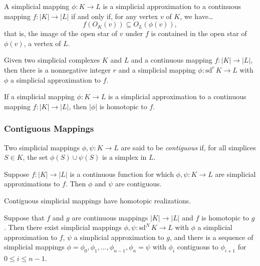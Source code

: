 \begin{proposition}
A simplicial mapping $\phi : K \rightarrow L$ is a simplicial approximation to a continuous mapping
$f: |K| \rightarrow |L|$ if and only if, for any vertex $v$ of $K$, we have\dots
$$f(O_K(v)) \subseteq O_L(\phi(v)),$$
that is, the image of the open star of $v$ under $f$ is contained in the open star of $\phi(v)$, a vertex of $L$.
\end{proposition}

\begin{theorem}
Given two simplicial complexes $K$ and $L$ and a continuous mapping $f : |K| \rightarrow |L|$,
then there is a nonnegative integer $r$ and a simplicial mapping $\phi: \textrm{sd}^r\, K \rightarrow L$
with $\phi$ a simplicial approximation to $f$.
\end{theorem}

\begin{proposition}
If a simplicial mapping $\phi : K \rightarrow L$ is a simplicial approximation to a continuous
mapping $f: |K| \rightarrow |L|$, then $|\phi|$ is homotopic to $f$.
\end{proposition}

\subsubsection{Contiguous Mappings}\label{contiguous}
Two simplicial mappings $\phi, \psi: K \rightarrow L$ are said to be \emph{contiguous} if, for all simplices $S \in K$,
the set $\phi(S) \cup \psi(S)$ is a simplex in $L$.

\begin{lemma}
Suppose $f : |K| \rightarrow |L|$ is a continuous function for which $\phi, \psi: K \rightarrow L$
are simplicial approximations to $f$. Then $\phi$ and $\psi$ are contiguous.
\end{lemma}

\begin{proposition}
Contiguous simplicial mappings have homotopic realizations.
\end{proposition}

\begin{theorem}
Suppose that $f$ and $g$ are continuous mappings $|K| \rightarrow |L|$ and $f$ is homotopic to $g$. Then
there exist simplicial mappings $\phi, \psi: \textrm{sd}^N \, K \rightarrow L$ with $\phi$ a simplicial approximation
to $f$, $\psi$ a simplicial approximation to $g$, and there is a sequence of simplicial mappings $\phi = \phi_0, \phi_1, \dots, \phi_{n-1}, \phi_n = \psi$
with $\phi_i$ contiguous to $\phi_{i+1}$ for $0 \leq i \leq n-1$.
\end{theorem}